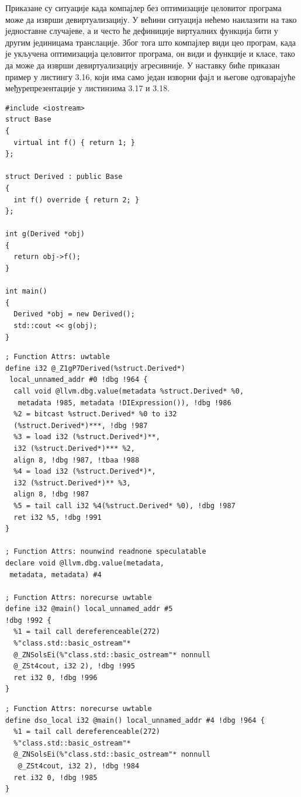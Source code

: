 \documentclass[12pt,oneside]{memoir}
\begin{document}
 Приказане су ситуације када компајлер без оптимизације целовитог програма може да
 изврши девиртуализацију.
 У већини ситуација нећемо наилазити на тако једноставне случајеве, а и често ће
 дефиниције виртуалних функција бити у другим јединицама транслације.
 Због тога што компајлер види цео програм, када је укључена оптимизација
 целовитог програма, он види и функције и класе, тако да може да изврши
 девиртуализацију агресивније.
 У наставку биће приказан  пример у листингу 3.16, који има само један изворни фајл и 
 његове одговарајуће међурепрезентације у листинзима 3.17 и 3.18.
 \begin{lstlisting}[frame=single,caption={Пример девиртуализације}, captionpos=b]
#include <iostream>
struct Base
{
  virtual int f() { return 1; }
};

struct Derived : public Base
{
  int f() override { return 2; }
};

int g(Derived *obj)
{
  return obj->f();
}

int main()
{
  Derived *obj = new Derived();
  std::cout << g(obj);
}
\end{lstlisting}
	
\begin{lstlisting}[frame=single,caption={Међурепрезентација без оптимизације целовитог програма }, captionpos=b]
; Function Attrs: uwtable
define i32 @_Z1gP7Derived(%struct.Derived*)
 local_unnamed_addr #0 !dbg !964 {
  call void @llvm.dbg.value(metadata %struct.Derived* %0,
   metadata !985, metadata !DIExpression()), !dbg !986
  %2 = bitcast %struct.Derived* %0 to i32 
  (%struct.Derived*)***, !dbg !987
  %3 = load i32 (%struct.Derived*)**, 
  i32 (%struct.Derived*)*** %2, 
  align 8, !dbg !987, !tbaa !988
  %4 = load i32 (%struct.Derived*)*, 
  i32 (%struct.Derived*)** %3, 
  align 8, !dbg !987
  %5 = tail call i32 %4(%struct.Derived* %0), !dbg !987
  ret i32 %5, !dbg !991
}

; Function Attrs: nounwind readnone speculatable
declare void @llvm.dbg.value(metadata,
 metadata, metadata) #4

; Function Attrs: norecurse uwtable
define i32 @main() local_unnamed_addr #5 
!dbg !992 {
  %1 = tail call dereferenceable(272) 
  %"class.std::basic_ostream"* 
  @_ZNSolsEi(%"class.std::basic_ostream"* nonnull 
  @_ZSt4cout, i32 2), !dbg !995
  ret i32 0, !dbg !996
}
\end{lstlisting}

\begin{lstlisting}[frame=single,caption={Међурепрезентација са оптимизацијом целовитог програма }, captionpos=b]
; Function Attrs: norecurse uwtable
define dso_local i32 @main() local_unnamed_addr #4 !dbg !964 {
  %1 = tail call dereferenceable(272) 
  %"class.std::basic_ostream"* 
  @_ZNSolsEi(%"class.std::basic_ostream"* nonnull
   @_ZSt4cout, i32 2), !dbg !984
  ret i32 0, !dbg !985
}
\end{lstlisting}
\end{document}
